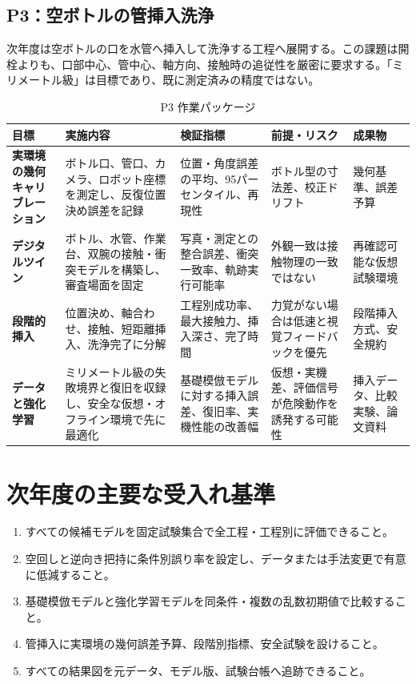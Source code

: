 \begin{landscape}
\section{P3：空ボトルの管挿入洗浄}

次年度は空ボトルの口を水管へ挿入して洗浄する工程へ展開する。この課題は開栓よりも、口部中心、管中心、軸方向、接触時の追従性を厳密に要求する。「ミリメートル級」は目標であり、既に測定済みの精度ではない。

\begin{table}[H]
\centering\footnotesize
\renewcommand{\arraystretch}{1.35}
\caption{P3 作業パッケージ}
\begin{tabularx}{\linewidth}{>{\bfseries}p{28mm}p{52mm}p{66mm}p{56mm}X}
\toprule
目標 & 実施内容 & 検証指標 & 前提・リスク & 成果物\\
\midrule
実環境の幾何キャリブレーション & ボトル口、管口、カメラ、ロボット座標を測定し、反復位置決め誤差を記録 & 位置・角度誤差の平均、95パーセンタイル、再現性 & ボトル型の寸法差、校正ドリフト & 幾何基準、誤差予算\\
デジタルツイン & ボトル、水管、作業台、双腕の接触・衝突モデルを構築し、審査場面を固定 & 写真・測定との整合誤差、衝突一致率、軌跡実行可能率 & 外観一致は接触物理の一致ではない & 再確認可能な仮想試験環境\\
段階的挿入 & 位置決め、軸合わせ、接触、短距離挿入、洗浄完了に分解 & 工程別成功率、最大接触力、挿入深さ、完了時間 & 力覚がない場合は低速と視覚フィードバックを優先 & 段階挿入方式、安全規約\\
データと強化学習 & ミリメートル級の失敗境界と復旧を収録し、安全な仮想・オフライン環境で先に最適化 & 基礎模倣モデルに対する挿入誤差、復旧率、実機性能の改善幅 & 仮想・実機差、評価信号が危険動作を誘発する可能性 & 挿入データ、比較実験、論文資料\\
\bottomrule
\end{tabularx}
\end{table}
\end{landscape}

\section{次年度の主要な受入れ基準}

\begin{enumerate}
  \item すべての候補モデルを固定試験集合で全工程・工程別に評価できること。
  \item 空回しと逆向き把持に条件別誤り率を設定し、データまたは手法変更で有意に低減すること。
  \item 基礎模倣モデルと強化学習モデルを同条件・複数の乱数初期値で比較すること。
  \item 管挿入に実環境の幾何誤差予算、段階別指標、安全試験を設けること。
  \item すべての結果図を元データ、モデル版、試験台帳へ追跡できること。
\end{enumerate}
